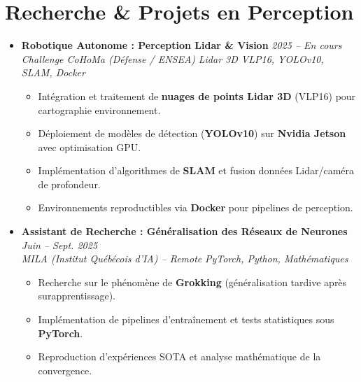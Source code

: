 \documentclass[a4paper,11pt]{article}
\begin{document}
\section{Recherche \& Projets en Perception}
\begin{itemize}[leftmargin=*, label={-}]

\item \textbf{Robotique Autonome : Perception Lidar \& Vision} \hfill \textit{2025 -- En cours} \\
\textit{Challenge CoHoMa (Défense / ENSEA)} \hfill \textit{Lidar 3D VLP16, YOLOv10, SLAM, Docker}
\vspace{-2pt}
    \begin{itemize}[leftmargin=0.4cm, nosep, label=\tiny$\bullet$]
        \item \small{Intégration et traitement de \textbf{nuages de points Lidar 3D} (VLP16) pour cartographie environnement.}
        \item \small{Déploiement de modèles de détection (\textbf{YOLOv10}) sur \textbf{Nvidia Jetson} avec optimisation GPU.}
        \item \small{Implémentation d'algorithmes de \textbf{SLAM} et fusion données Lidar/caméra de profondeur.}
        \item \small{Environnements reproductibles via \textbf{Docker} pour pipelines de perception.}
    \end{itemize}
\vspace{6pt}

\item \textbf{Assistant de Recherche : Généralisation des Réseaux de Neurones} \hfill \textit{Juin -- Sept. 2025} \\
\textit{MILA (Institut Québécois d'IA) -- Remote} \hfill \textit{PyTorch, Python, Mathématiques}
\vspace{-2pt}
    \begin{itemize}[leftmargin=0.4cm, nosep, label=\tiny$\bullet$]
        \item \small{Recherche sur le phénomène de \textbf{Grokking} (généralisation tardive après surapprentissage).}
        \item \small{Implémentation de pipelines d'entraînement et tests statistiques sous \textbf{PyTorch}.}
        \item \small{Reproduction d'expériences SOTA et analyse mathématique de la convergence.}
    \end{itemize}
\vspace{6pt}


\end{itemize}
\end{document}
